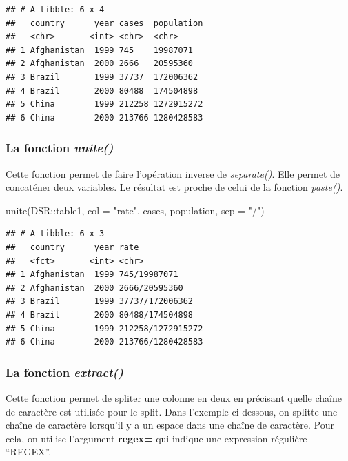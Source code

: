 \documentclass[
]{book}
\newenvironment{Shaded}{\begin{snugshade}}{\end{snugshade}}
\newcommand{\AttributeTok}[1]{\textcolor[rgb]{0.77,0.63,0.00}{#1}}
\newcommand{\FunctionTok}[1]{\textcolor[rgb]{0.00,0.00,0.00}{#1}}
\newcommand{\NormalTok}[1]{#1}
\newcommand{\SpecialCharTok}[1]{\textcolor[rgb]{0.00,0.00,0.00}{#1}}
\newcommand{\StringTok}[1]{\textcolor[rgb]{0.31,0.60,0.02}{#1}}
\theoremstyle{definition}
\theoremstyle{definition}
\theoremstyle{definition}
\theoremstyle{definition}
\theoremstyle{remark}
\begin{document}
\begin{verbatim}
## # A tibble: 6 x 4
##   country      year cases  population
##   <chr>       <int> <chr>  <chr>     
## 1 Afghanistan  1999 745    19987071  
## 2 Afghanistan  2000 2666   20595360  
## 3 Brazil       1999 37737  172006362 
## 4 Brazil       2000 80488  174504898 
## 5 China        1999 212258 1272915272
## 6 China        2000 213766 1280428583
\end{verbatim}

\hypertarget{la-fonction-unite}{%
\subsubsection{\texorpdfstring{La fonction \emph{unite()}}{La fonction unite()}}\label{la-fonction-unite}}

Cette fonction permet de faire l'opération inverse de \emph{separate()}. Elle permet de concaténer deux variables. Le résultat est proche de celui de la fonction \emph{paste()}.

\begin{Shaded}
\begin{Highlighting}[]
\FunctionTok{unite}\NormalTok{(DSR}\SpecialCharTok{::}\NormalTok{table1, }\AttributeTok{col =} \StringTok{"rate"}\NormalTok{,}
\NormalTok{      cases, population, }\AttributeTok{sep =} \StringTok{"/"}\NormalTok{)}
\end{Highlighting}
\end{Shaded}

\begin{verbatim}
## # A tibble: 6 x 3
##   country      year rate             
##   <fct>       <int> <chr>            
## 1 Afghanistan  1999 745/19987071     
## 2 Afghanistan  2000 2666/20595360    
## 3 Brazil       1999 37737/172006362  
## 4 Brazil       2000 80488/174504898  
## 5 China        1999 212258/1272915272
## 6 China        2000 213766/1280428583
\end{verbatim}

\hypertarget{la-fonction-extract}{%
\subsubsection{\texorpdfstring{La fonction \emph{extract()}}{La fonction extract()}}\label{la-fonction-extract}}

Cette fonction permet de spliter une colonne en deux en précisant quelle chaîne de caractère est utilisée pour le split. Dans l'exemple ci-dessous, on splitte une chaîne de caractère lorsqu'il y a un espace dans une chaîne de caractère. Pour cela, on utilise l'argument \textbf{regex=} qui indique une expression régulière ``REGEX''.
\end{document}

